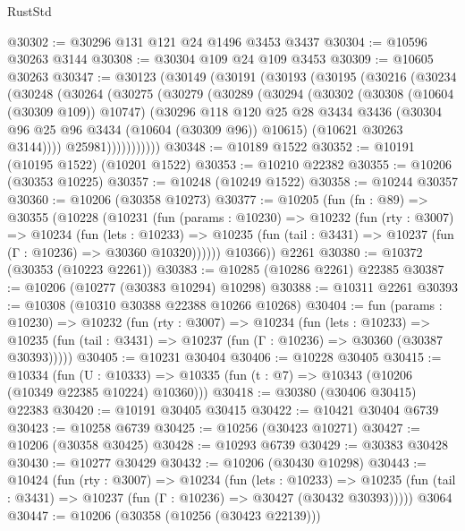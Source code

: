 \begin{lexlean}{RustStd}
\begin{coremodule}
@30302 := @30296 @131 @121 @24 @1496 @3453 @3437
@30304 := @10596 @30263 @3144
@30308 := @30304 @109 @24 @109 @3453
@30309 := @10605 @30263
@30347 := @30123
    (@30149
      (@30191
        (@30193
          (@30195
            (@30216
              (@30234
                (@30248
                  (@30264
                    (@30275
                      (@30279
                        (@30289
                          (@30294
                            (@30302
                              (@30308 (@10604 (@30309 @109)) @10747)
                              (@30296
                                @118
                                @120
                                @25
                                @28
                                @3434
                                @3436
                                (@30304 @96 @25 @96 @3434 (@10604 (@30309 @96)) @10615)
                                (@10621 @30263 @3144))))
                          @25981)))))))))))
@30348 := @10189 @1522
@30352 := @10191 (@10195 @1522) (@10201 @1522)
@30353 := @10210 @22382
@30355 := @10206 (@30353 @10225)
@30357 := @10248 (@10249 @1522)
@30358 := @10244 @30357
@30360 := @10206 (@30358 @10273)
@30377 := @10205
    (fun (fn : @89) =>
    @30355
      (@10228
        (@10231
          (fun (params : @10230) =>
          @10232
            (fun (rty : @3007) =>
            @10234
              (fun (lets : @10233) =>
              @10235 (fun (tail : @3431) => @10237 (fun (Γ : @10236) => @30360 @10320))))))
        @10366))
    @2261
@30380 := @10372 (@30353 (@10223 @2261))
@30383 := @10285 (@10286 @2261) @22385
@30387 := @10206 (@10277 (@30383 @10294) @10298)
@30388 := @10311 @2261
@30393 := @10308 (@10310 @30388 @22388 @10266 @10268)
@30404 := fun (params : @10230) =>
  @10232
    (fun (rty : @3007) =>
    @10234
      (fun (lets : @10233) =>
      @10235 (fun (tail : @3431) => @10237 (fun (Γ : @10236) => @30360 (@30387 @30393)))))
@30405 := @10231 @30404
@30406 := @10228 @30405
@30415 := @10334
    (fun (U : @10333) => @10335 (fun (t : @7) => @10343 (@10206 (@10349 @22385 @10224) @10360)))
@30418 := @30380 (@30406 @30415) @22383
@30420 := @10191 @30405 @30415
@30422 := @10421 @30404 @6739
@30423 := @10258 @6739
@30425 := @10256 (@30423 @10271)
@30427 := @10206 (@30358 @30425)
@30428 := @10293 @6739
@30429 := @30383 @30428
@30430 := @10277 @30429
@30432 := @10206 (@30430 @10298)
@30443 := @10424
    (fun (rty : @3007) =>
    @10234
      (fun (lets : @10233) =>
      @10235 (fun (tail : @3431) => @10237 (fun (Γ : @10236) => @30427 (@30432 @30393)))))
    @3064
@30447 := @10206 (@30358 (@10256 (@30423 @22139)))

\end{coremodule}
\end{lexlean}
